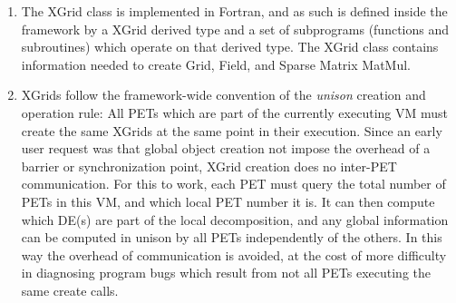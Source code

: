

\begin{enumerate}

\item The XGrid class is implemented in Fortran, and as such is
defined inside the framework by a XGrid derived type and a set of 
subprograms (functions and subroutines) which operate on that derived type.  
The XGrid class contains information needed to create Grid, Field, and
Sparse Matrix MatMul.

\item XGrids follow the framework-wide convention of the
{\it unison} creation and operation rule: All PETs which are
part of the currently executing VM must create the
same XGrids at the same point in their execution.  Since an early
user request was that global object creation not impose the overhead of
a barrier or synchronization point, XGrid creation does no inter-PET
communication.  For this to work, each PET must query the total number
of PETs in this VM, and which local PET number it is.  It can then
compute which DE(s) are part of the local decomposition, and any
global information can be computed in unison by all PETs independently
of the others.  In this way the overhead of communication is avoided,
at the cost of more difficulty in diagnosing program bugs which result
from not all PETs executing the same create calls.

\end{enumerate}
